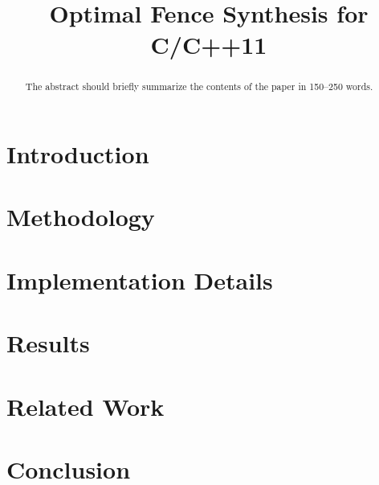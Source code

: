 \documentclass[runningheads]{llncs2e/llncs}
\begin{document}
%
\title{Optimal Fence Synthesis for C/C++11}
%
%
\maketitle              %
%
\begin{abstract}
The abstract should briefly summarize the contents of the paper in
150--250 words.

\end{abstract}
%
%
%
\section{Introduction} \label{sec:intro}

%

%

%

\section{Methodology} \label{sec:methodology}


\section{Implementation Details} \label{sec:implementation}


\section{Results} \label{sec:results}


\section{Related Work} \label{sec:related}
\section{Conclusion} \label{sec:conclusion}



\end{document}
